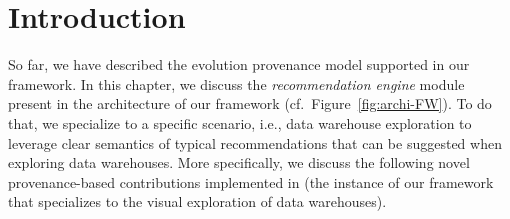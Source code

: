 \section{Introduction}
\label{sec:intro}

So far, we have described the evolution provenance model supported in our framework. In this chapter, we discuss the \emph{recommendation engine} module present in the architecture of our framework (cf.~Figure~\ref{fig:archi-FW}).
To do that, we specialize to a specific scenario, i.e., data warehouse exploration to leverage clear semantics of typical recommendations that can be suggested when exploring data warehouses. 
More specifically, we discuss the following novel provenance-based contributions implemented in \prototype{} (the instance of our framework \framework{} that specializes to the visual exploration of data warehouses).

